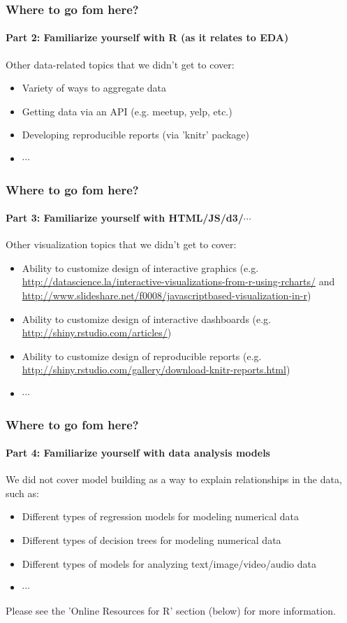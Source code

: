 \begin{frame}
  \frametitle{Where to go fom here?}
  \framesubtitle{Part 2: Familiarize yourself with R (as it relates to EDA)}

  Other data-related topics that we didn't get to cover:
  \begin{itemize}
    \item Variety of ways to aggregate data
    \item Getting data via an API (e.g. meetup, yelp, etc.)
    \item Developing reproducible reports (via 'knitr' package)    
    \item $\cdots$
  \end{itemize}
\end{frame}

\begin{frame}
  \frametitle{Where to go fom here?}
  \framesubtitle{Part 3: Familiarize yourself with HTML/JS/d3/$\cdots$}

  Other visualization topics that we didn't get to cover:
  \begin{itemize}
    \item Ability to customize design of interactive graphics (e.g. \url{http://datascience.la/interactive-visualizations-from-r-using-rcharts/} and \url{http://www.slideshare.net/f0008/javascriptbased-visualization-in-r})
    \item Ability to customize design of interactive dashboards (e.g. \url{http://shiny.rstudio.com/articles/})
    \item Ability to customize design of reproducible reports   (e.g. \url{http://shiny.rstudio.com/gallery/download-knitr-reports.html}) 
    \item $\cdots$
  \end{itemize}
\end{frame}

\begin{frame}
  \frametitle{Where to go fom here?}
  \framesubtitle{Part 4: Familiarize yourself with data analysis models}

  We did not cover model building as a way to explain relationships in the data, such as:
  \begin{itemize}
    \item Different types of regression models for modeling numerical data
    \item Different types of decision trees for modeling numerical data
    \item Different types of models for analyzing text/image/video/audio data   
    \item $\cdots$
  \end{itemize}
  Please see the 'Online Resources for R' section (below) for more information.
\end{frame}

